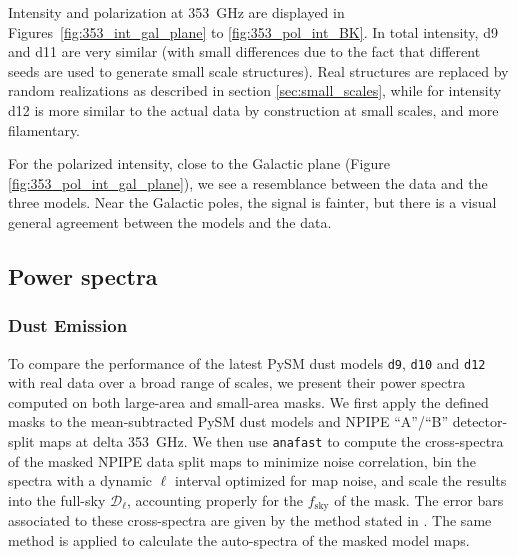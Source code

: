 \documentclass[twocolumn]{aastex631}
\begin{document}
Intensity and polarization at 353~GHz are displayed in Figures~\ref{fig:353_int_gal_plane} to \ref{fig:353_pol_int_BK}. 
In total intensity, d9 and d11 are very similar (with small differences due to the fact that different seeds are used to generate small scale structures). Real structures are replaced by random realizations as described in section \ref{sec:small_scales}, while for intensity d12 is more similar to the actual data by construction at small scales, and more filamentary. 

For the polarized intensity, close to the Galactic plane (Figure \ref{fig:353_pol_int_gal_plane}), we see a resemblance between the data and the three models. Near the Galactic poles, the signal is fainter, but there is a visual general agreement between the models and the data. 
\subsection{Power spectra}
\label{sec:PS-validation}

\subsubsection{Dust Emission}

To compare the performance of the latest PySM dust models \texttt{d9}, \texttt{d10} and \texttt{d12} with real data over a broad range of scales, we present their power spectra computed on both large-area and small-area masks. We first apply the defined masks to the mean-subtracted PySM dust models and NPIPE ``A''/``B'' detector-split maps at delta 353~GHz. We then use \texttt{anafast} to compute the cross-spectra of the masked NPIPE data split maps to minimize noise correlation, bin the spectra with a dynamic $\ell$ interval optimized for map noise, and scale the results into the full-sky $\mathcal{D}_\ell$, accounting properly for the $f_{\mathrm{sky}}$ of the mask. The error bars associated to these cross-spectra are given by the method stated in \cite{Tristram:2005}. The same method is applied to calculate the auto-spectra of the masked model maps. 

\end{document}
